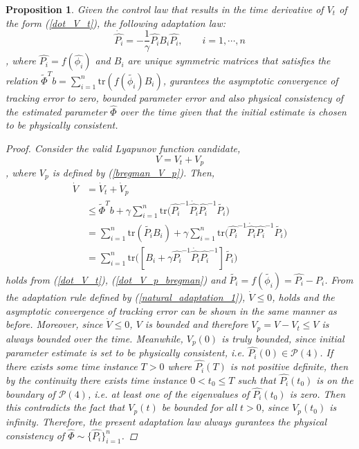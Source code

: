 \documentclass[letterpaper, 10 pt, conference]{ieeeconf}  %
\newtheorem{proposition}{Proposition}
\begin{document}
\begin{proposition}
Given the control law that results in the time derivative of $V_{t}$ of the form (\ref{dot_V_t}), the following adaptation law:
\begin{equation}
\dot{\hat{P_i}} = -\frac{1}{\gamma}\hat{P_i} B_i \hat{P_i}, \qquad i = 1, \cdots, n \label{natural_adaptation_1}
\end{equation}
, where $\hat{P_i} = f(\hat{\phi_i})$ and $B_i$ are unique symmetric matrices that satisfies the relation $\tilde{\Phi}^{T}b = \sum_{i=1}^n \mathrm{tr}(f(\tilde{\phi_i})B_i)$, gurantees the asymptotic convergence of tracking error to zero, bounded parameter error and also physical consistency of the estimated parameter $\hat{\Phi}$ over the time given that the initial estimate is chosen to be physically consistent.

\begin{proof}
Consider the valid Lyapunov function candidate,
\begin{equation*}
V = V_t + V_p
\end{equation*}
, where $V_p$ is defined by (\ref{bregman_V_p}). Then,
\begin{align*}
\dot{V} &= \dot{V}_t + \dot{V}_p\\
&\leq \tilde{\Phi}^{T}b + \gamma\sum_{i=1}^n \mathrm{tr}\big(\hat{P_i}^{-1}\dot{\hat{P_i}}\hat{P_i}^{-1}\tilde{P_i}\big)\\
 &=\sum_{i=1}^n\mathrm{tr}(\tilde{P_i}B_i) + \gamma\sum_{i=1}^n \mathrm{tr}\big(\hat{P_i}^{-1}\dot{\hat{P_i}}\hat{P_i}^{-1}\tilde{P_i}\big)\\
 &= \sum_{i=1}^n \mathrm{tr}\big([B_i +\gamma\hat{P_i}^{-1}\dot{\hat{P_i}}\hat{P_i}^{-1}]\tilde{P_i}\big)
\end{align*}
holds from (\ref{dot_V_t}), (\ref{dot_V_p_bregman}) and $\tilde{P_i} = f(\tilde{\phi_i}) = \hat{P_i}-P_i$. From the adaptation rule defined by (\ref{natural_adaptation_1}), $\dot{V}\leq 0$,
holds and the asymptotic convergence of tracking error can be shown in the same manner as before. Moreover, since $\dot{V} \leq 0$, $V$ is bounded and therefore $V_p = V - V_t \leq V$ is always bounded over the time. Meanwhile, $V_p(0)$ is truly bounded, since initial parameter estimate is set to be physically consistent, i.e. $\hat{P_i}(0) \in \mathcal{P}(4)$. If there exists some time instance $T>0$ where $\hat{P_i}(T)$ is not positive definite, then by the continuity there exists time instance $0<t_0\leq T$ such that $\hat{P_i}(t_0)$ is on the boundary of $\mathcal{P}(4)$, i.e. at least one of the eigenvalues of $\hat{P_i}(t_0)$ is zero. Then this contradicts the fact that $V_p(t)$ be bounded for all $t>0$, since $V_p(t_0)$ is infinity. Therefore, the present adaptation law always gurantees the physical consistency of $\hat{\Phi} \sim \{\hat{P_i}\}_{i=1}^n$.
\end{proof}
\end{proposition}
\end{document}
